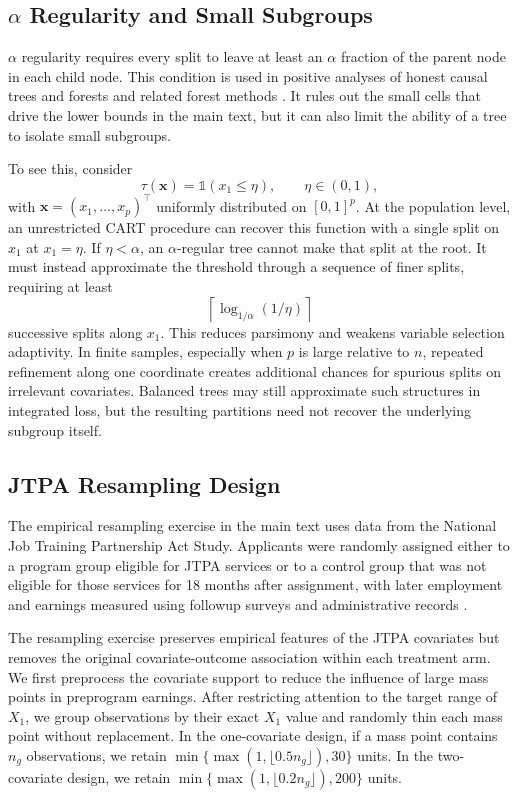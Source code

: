 \documentclass[10pt]{article}
\def\bx{\mathbf{x}}
\newcommand{\Indicator}{\mathds{1}}
\theoremstyle{definition}
\theoremstyle{remark}
\begin{document}
\subsection{\texorpdfstring{$\alpha$ Regularity}{alpha Regularity} and Small Subgroups}\label{sa-sec:alpha-details}

$\alpha$ regularity requires every split to leave at least an $\alpha$ fraction of the parent node in each child node. This condition is used in positive analyses of honest causal trees and forests \citep{wager-Athey_2018_JASA} and related forest methods \citep{Meinshausen_2006_JMLR,athey2019generalized,Behr-Wang-Li-Yu_2022_PNAS}. It rules out the small cells that drive the lower bounds in the main text, but it can also limit the ability of a tree to isolate small subgroups.

To see this, consider
\[
    \tau(\bx) = \Indicator(x_1 \le \eta), \qquad \eta \in (0,1),
\]
with $\bx=(x_1,\ldots,x_p)^\top$ uniformly distributed on $[0,1]^p$. At the population level, an unrestricted CART procedure can recover this function with a single split on $x_1$ at $x_1=\eta$. If $\eta<\alpha$, an $\alpha$-regular tree cannot make that split at the root. It must instead approximate the threshold through a sequence of finer splits, requiring at least
\[
    \left\lceil \log_{1/\alpha}(1/\eta) \right\rceil
\]
successive splits along $x_1$. This reduces parsimony and weakens variable selection adaptivity. In finite samples, especially when $p$ is large relative to $n$, repeated refinement along one coordinate creates additional chances for spurious splits on irrelevant covariates. Balanced trees may still approximate such structures in integrated loss, but the resulting partitions need not recover the underlying subgroup itself.

\subsection{JTPA Resampling Design}\label{sa-sec:jtpa-details}

The empirical resampling exercise in the main text uses data from the National Job Training Partnership Act Study. Applicants were randomly assigned either to a program group eligible for JTPA services or to a control group that was not eligible for those services for 18 months after assignment, with later employment and earnings measured using followup surveys and administrative records \citep{Bloom-etal_1997_JHR}.

The resampling exercise preserves empirical features of the JTPA covariates but removes the original covariate-outcome association within each treatment arm. We first preprocess the covariate support to reduce the influence of large mass points in preprogram earnings. After restricting attention to the target range of $X_1$, we group observations by their exact $X_1$ value and randomly thin each mass point without replacement. In the one-covariate design, if a mass point contains $n_g$ observations, we retain $\min\{\max(1,\lfloor 0.5 n_g \rfloor),30\}$ units. In the two-covariate design, we retain $\min\{\max(1,\lfloor 0.2 n_g \rfloor),200\}$ units.
\end{document}
